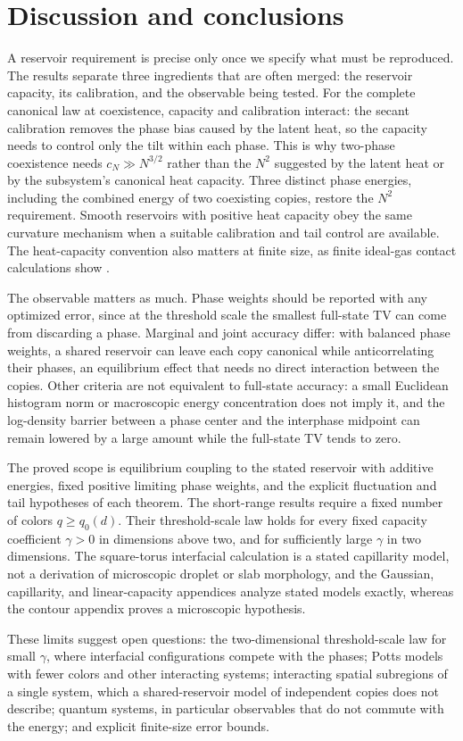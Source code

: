 \section{Discussion and conclusions}
\label{sec:conclusions}

A reservoir requirement is precise only once we specify what must be
reproduced. The results separate three ingredients that are often
merged: the reservoir capacity, its calibration, and the observable
being tested. For the complete canonical law at coexistence, capacity
and calibration interact: the secant calibration removes the phase bias
caused by the latent heat, so the capacity needs to control only the
tilt within each phase. This is why two-phase coexistence needs $c_N\gg
N^{3/2}$ rather than the $N^2$ suggested by the latent heat or by the
subsystem's canonical heat capacity. Three distinct phase energies,
including the combined energy of two coexisting copies, restore the
$N^2$ requirement. Smooth reservoirs with positive heat capacity obey
the same curvature mechanism when a suitable calibration and tail
control are available. The heat-capacity convention also matters at
finite size, as finite ideal-gas contact calculations show
\cite{CortiEtAl2023}.

The observable matters as much. Phase weights should be reported with
any optimized error, since at the threshold scale the smallest
full-state TV can come from discarding a phase. Marginal and joint
accuracy differ: with balanced phase weights, a shared reservoir can
leave each copy canonical while anticorrelating their phases, an
equilibrium effect that needs no direct interaction between the copies.
Other criteria are not equivalent to full-state accuracy: a small
Euclidean histogram norm or macroscopic energy concentration does not
imply it, and the log-density barrier between a phase center and the
interphase midpoint can remain lowered by a large amount while the
full-state TV tends to zero.

The proved scope is equilibrium coupling to the stated reservoir with
additive energies, fixed positive limiting phase weights, and the
explicit fluctuation and tail hypotheses of each theorem. The
short-range results require a fixed number of colors $q\ge q_0(d)$.
Their threshold-scale law holds for every fixed capacity coefficient
$\gamma>0$ in dimensions above two, and for sufficiently large $\gamma$
in two dimensions. The square-torus interfacial calculation is a stated
capillarity model, not a derivation of microscopic droplet or slab
morphology, and the Gaussian, capillarity, and linear-capacity
appendices analyze stated models exactly, whereas the contour appendix
proves a microscopic hypothesis.

These limits suggest open questions: the two-dimensional threshold-scale
law for small $\gamma$, where interfacial configurations compete with
the phases; Potts models with fewer colors and other interacting
systems; interacting spatial subregions of a single system, which a
shared-reservoir model of independent copies does not describe; quantum
systems, in particular observables that do not commute with the energy;
and explicit finite-size error bounds.
